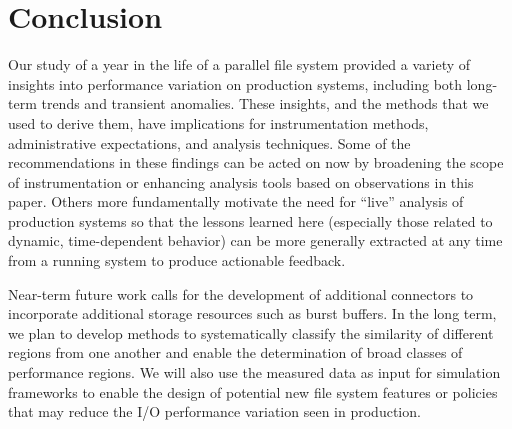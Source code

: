 \section{Conclusion} \label{sec:conclusions}
Our study of a year in the life of a parallel file system provided a
variety of insights into performance variation on production systems,
including both long-term trends and transient anomalies.  These insights,
and the methods that we used to derive them, have implications for
instrumentation methods, administrative expectations, and analysis
techniques. Some of the recommendations in these findings can be acted on
now by broadening the scope of instrumentation or enhancing analysis tools based on observations in this paper.
Others more fundamentally motivate the need for ``live'' analysis of
production systems so that the lessons learned here (especially those
related to dynamic, time-dependent behavior) can be more generally extracted
at any time from a running system to produce actionable feedback.

Near-term future work calls for the development of additional \tokio
connectors to incorporate additional storage resources such as burst
buffers.
In the long term, we plan to develop methods to systematically classify the
similarity of different regions from one another and enable the
determination of broad classes of performance regions.
We will also use the measured data as input for simulation frameworks to
enable the design of potential new file system features or policies that may
reduce the I/O performance variation seen in production. 
\endinput

